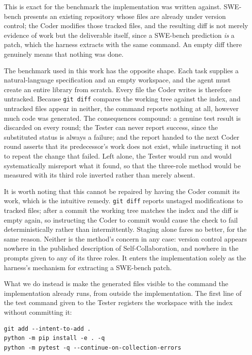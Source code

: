 This is exact for the benchmark the implementation was written against.
SWE-bench presents an existing repository whose files are already under version
control; the Coder modifies those tracked files, and the resulting diff is not
merely evidence of work but the deliverable itself, since a SWE-bench
prediction \emph{is} a patch, which the harness extracts with the same command.
An empty diff there genuinely means that nothing was done.

The benchmark used in this work has the opposite shape. Each task supplies a
natural-language specification and an empty workspace, and the agent must
create an entire library from scratch. Every file the Coder writes is therefore
untracked. Because \texttt{git diff} compares the working tree against the
index, and untracked files appear in neither, the command reports nothing at
all, however much code was generated. The consequences compound: a genuine test
result is discarded on every round; the Tester can never report success, since
the substituted status is always a failure; and the report handed to the next
Coder round asserts that its predecessor's work does not exist, while
instructing it not to repeat the change that failed. Left alone, the Tester
would run and would systematically misreport what it found, so that the
three-role method would be measured with its third role inverted rather than
merely absent.

It is worth noting that this cannot be repaired by having the Coder commit its
work, which is the intuitive remedy. \texttt{git diff} reports unstaged
modifications to tracked files; after a commit the working tree matches the
index and the diff is empty again, so instructing the Coder to commit would
cause the check to fail deterministically rather than intermittently. Staging
alone fares no better, for the same reason. Neither is the method's concern in
any case: version control appears nowhere in the published description of
Self-Collaboration, and nowhere in the prompts given to any of its three roles.
It enters the implementation solely as the harness's mechanism for extracting a
SWE-bench patch.

What we do instead is make the generated files visible to the command the
implementation already runs, from outside the implementation. The first line of
the test command given to the Tester registers the workspace with the index
without committing it:

\begin{verbatim}
git add --intent-to-add .
python -m pip install -e . -q
python -m pytest -q --continue-on-collection-errors
\end{verbatim}

